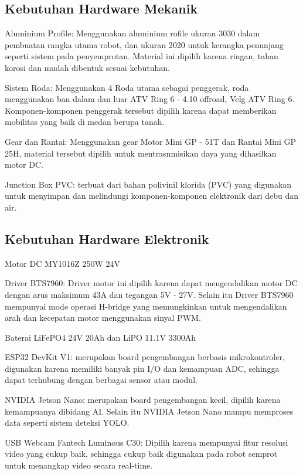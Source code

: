 \subsection{Kebutuhan Hardware Mekanik}
\begin{packed_item}
	\item Aluminium Profile: Menggunakan aluminium rofile ukuran 3030 dalam pembuatan rangka utama robot, dan ukuran 2020 untuk kerangka penunjang seperti sistem pada penyemprotan. Material ini dipilih karena ringan, tahan korosi dan mudah dibentuk sesuai kebutuhan.  
	\item Sistem Roda: Menggunakan 4 Roda utama sebagai penggerak, roda menggunakan ban dalam dan luar ATV Ring 6 - 4.10 offroad, Velg ATV Ring 6. Komponen-komponen penggerak tersebut dipilih karena dapat memberikan mobilitas yang baik di medan berupa tanah.
	\item Gear dan Rantai: Menggunakan gear Motor Mini GP - 51T dan Rantai Mini GP 25H, material tersebut dipilih untuk mentrasnmisikan daya yang dihasilkan motor DC.
	\item Junction Box PVC:  terbuat dari bahan polivinil klorida (PVC) yang digunakan untuk menyimpan dan melindungi  komponen-komponen elektronik dari debu dan air.
\end{packed_item}

\subsection{Kebutuhan Hardware Elektronik}
\begin{packed_item}
	\item Motor DC  MY1016Z 250W 24V
	\item Driver BTS7960: Driver motor ini dipilih karena dapat mengendalikan motor DC dengan arus maksimum 43A dan tegangan 5V - 27V. Selain itu  Driver BTS7960 mempunyai mode operasi H-bridge yang memungkinkan untuk mengendalikan arah dan kecepatan motor menggunakan sinyal PWM. 
	\item Baterai LiFePO4 24V 20Ah dan LiPO 11.1V 3300Ah
	\item ESP32 DevKit V1: merupakan board pengembangan berbasis mikrokontroler, digunakan karena memiliki banyak pin I/O dan kemampuan ADC, sehingga dapat terhubung dengan berbagai sensor atau modul. 
	\item NVIDIA Jetson Nano: merupakan board pengembangan kecil, dipilih karena kemampuanya dibidang AI. Selain itu NVIDIA Jetson Nano mampu memproses data seperti sistem deteksi YOLO.
	\item  USB Webcam Fantech Luminous C30: Dipilih karena mempunyai fitur resolusi video yang cukup baik, sehingga cukup baik  digunakan pada robot semprot untuk menangkap video secara real-time.
\end{packed_item}

